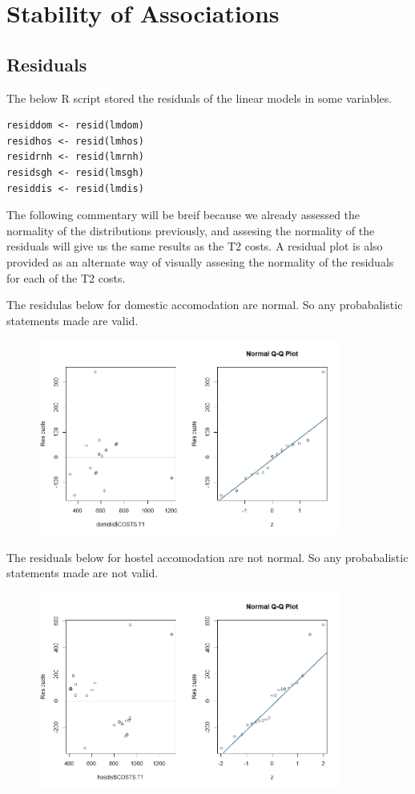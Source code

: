 \documentclass[]{article}
\begin{document}
\newpage
\section{Stability of Associations}
\subsection{Residuals}
The below R script stored the residuals of the linear models in some variables.
\begin{lstlisting}
residdom <- resid(lmdom)
residhos <- resid(lmhos)
residrnh <- resid(lmrnh)
residsgh <- resid(lmsgh)
residdis <- resid(lmdis)
\end{lstlisting}
\begin{flushleft}
The following commentary will be breif because we already assessed the normality of the distributions previously, and assesing the normality of the residuals will give us the same results as the T2 costs. A residual plot is also provided as an alternate way of visually assesing the normality of the residuals for each of the T2 costs.
\end{flushleft}
The residulas below for domestic accomodation are normal. So any probabalistic statements made are valid.
\begin{figure}[H]
\centering
\includegraphics[width=10cm]{RStudio/jpeg/Res_DOM.jpeg}
\end{figure}
The residuals below for hostel accomodation are not normal. So any probabalistic statements made are not valid.
\begin{figure}[H]
\centering
\includegraphics[width=10cm]{RStudio/jpeg/Res_HOS.jpeg}
\end{figure}
\end{document}
